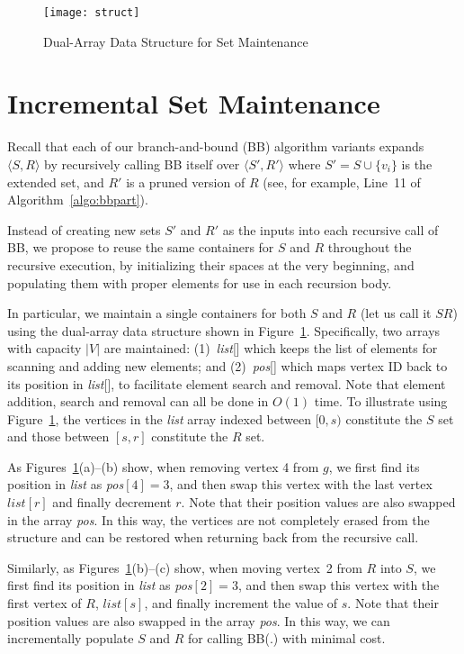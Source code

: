 \documentclass[sigconf, nonacm]{acmart}
\begin{document}
\begin{figure}[t]
        \centering
        \texttt{[image: struct]}
        \caption{Dual-Array Data Structure for Set Maintenance}\label{struct}
        \vspace{2mm}
\end{figure}

\section{Incremental Set Maintenance}\label{appendix:dual} 

Recall that each of our branch-and-bound (BB) algorithm variants expands $\langle S, R\rangle$ by recursively calling BB itself over $\langle S', R'\rangle$ where $S'=S\cup\{v_i\}$ is the extended set, and $R'$ is a pruned version of $R$ (see, for example, Line~11 of Algorithm~\ref{algo:bbpart}). 
    
Instead of creating new sets $S'$ and $R'$ as the inputs into each recursive call of BB, we propose to reuse the same containers for $S$ and $R$ throughout the recursive execution, by initializing their spaces at the very beginning, and populating them with proper elements for use in each recursion body.

In particular, we maintain a single containers for both $S$ and $R$ (let us call it $SR$) using the dual-array data structure shown in Figure~\ref{struct}. Specifically, two arrays with capacity $|V|$ are maintained: (1)~\textit{list}[] which keeps the list of elements for scanning and adding new elements; and (2)~\textit{pos}[] which maps vertex ID back to its position in \textit{list}[], to facilitate element search and removal. Note that element addition, search and removal can all be done in $O(1)$ time. To illustrate using Figure~\ref{struct}, the vertices in the \textit{list} array indexed between $[0, s)$ constitute the $S$ set and those between $[s, r]$ constitute the $R$ set.

As Figures~\ref{struct}(a)--(b) show, when removing vertex 4 from $g$, we first find its position in \textit{list} as \textit{pos}$[4]=3$, and then swap this vertex with the last vertex $list[r]$ and finally decrement $r$. Note that their position values are also swapped in the array \textit{pos}. 
%
In this way, the vertices are not completely erased from the structure and can be restored when returning back from the recursive call.

Similarly, as Figures~\ref{struct}(b)--(c) show, when moving vertex~2 from $R$ into $S$, we first find its position in \textit{list} as \textit{pos}$[2]=3$, and then swap this vertex with the first vertex of $R$, $list[s]$, and finally increment the value of $s$. Note that their position values are also swapped in the array \textit{pos}. In this way, we can incrementally populate $S$ and $R$ for calling BB(.) with minimal cost.
\end{document}
